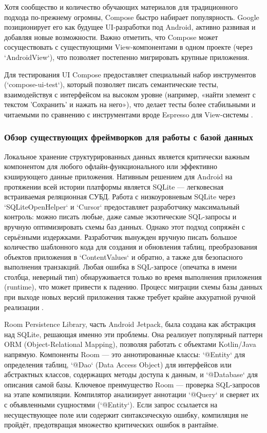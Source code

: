 Хотя сообщество и количество обучающих материалов для традиционного подхода по-прежнему огромны, Compose быстро набирает популярность. Google позиционирует его как будущее UI-разработки под Android, активно развивая и добавляя новые возможности. Важно отметить, что Compose может сосуществовать с существующими View-компонентами в одном проекте (через `AndroidView`), что позволяет постепенно мигрировать крупные приложения.

Для тестирования UI Compose предоставляет специальный набор инструментов (`compose-ui-test`), который позволяет писать семантические тесты, взаимодействуя с интерфейсом на высоком уровне (например, «найти элемент с текстом 'Сохранить' и нажать на него»), что делает тесты более стабильными и читаемыми по сравнению с инструментами вроде Espresso для View-системы \cite{refe}.

\subsubsection{Обзор существующих фреймворков для работы с базой данных}

Локальное хранение структурированных данных является критически важным компонентом для любого офлайн-функционального или эффективно кэширующего данные приложения. Нативным решением для Android на протяжении всей истории платформы является SQLite — легковесная встраиваемая реляционная СУБД. Работа с низкоуровневым SQLite через `SQLiteOpenHelper` и `Cursor` предоставляет разработчику максимальный контроль: можно писать любые, даже самые экзотические SQL-запросы и вручную оптимизировать схемы баз данных. Однако этот подход сопряжён с серьёзными издержками. Разработчик вынужден вручную писать большое количество шаблонного кода для создания и обновления таблиц, преобразования объектов приложения в `ContentValues` и обратно, а также для безопасного выполнения транзакций. Любая ошибка в SQL-запросе (опечатка в имени столбца, неверный тип) обнаруживается только во время выполнения приложения (runtime), что может привести к падению. Процесс миграции схемы базы данных при выходе новых версий приложения также требует крайне аккуратной ручной реализации \cite{reff}.

Room Persistence Library, часть Android Jetpack, была создана как абстракция над SQLite, решающая именно эти проблемы. Она реализует популярный паттерн ORM (Object-Relational Mapping), позволяя работать с объектами Kotlin/Java напрямую. Компоненты Room — это аннотированные классы: `@Entity` для определения таблиц, `@Dao` (Data Access Object) для интерфейсов или абстрактных классов, содержащих методы доступа к данным, и `@Database` для описания самой базы. Ключевое преимущество Room — проверка SQL-запросов на этапе компиляции. Компилятор анализирует аннотации `@Query` и сверяет их с объявленными сущностями (`@Entity`). Если запрос ссылается на несуществующее поле или содержит синтаксическую ошибку, компиляция не пройдёт, предотвращая множество критических ошибок в рантайме.

